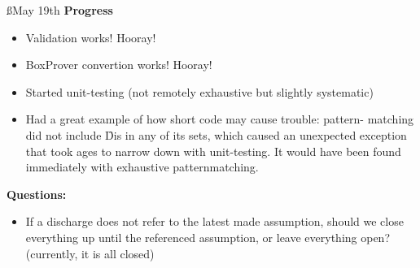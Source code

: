 \documentclass[a4paper]{article}
\begin{document}
\ss{May 19th}
{\bf Progress}
  \begin{itemize}
    \item Validation works! Hooray!
    \item BoxProver convertion works! Hooray!
    \item Started unit-testing (not remotely exhaustive but slightly
    systematic)
    \item Had a great example of how short code may cause trouble: pattern-
    matching did not include \f{Dis} in any of its sets, which caused an
    unexpected exception that took ages to narrow down with unit-testing. 
    It would have been found immediately with exhaustive patternmatching.
  \end{itemize}
{\bf Questions:}
  \begin{itemize}
    \item If a discharge does not refer to the latest made assumption, 
    should we close everything up until the referenced assumption, or
    leave everything open? (currently, it is all closed)
  \end{itemize}

\label{LastBody}
\end{document}
